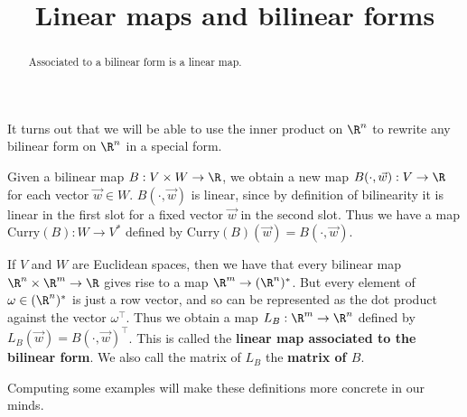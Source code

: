 \documentclass{ximera}
\title{Linear maps and bilinear forms}
\begin{document}
\begin{abstract}
  Associated to a bilinear form is a linear map.
\end{abstract}\maketitle
	
It turns out that we will be able to use the inner product on $\R^n$ to rewrite any bilinear form on $\R^n$ in a special form. 
	
Given a bilinear map $B:V \times W \to \R$, we obtain a new map $B(\cdot, \vec{w}):V \to \R$ for each vector $\vec{w} \in W$.   $B(\cdot, \vec{w})$ is linear, since 
by definition of bilinearity it is linear in the first slot for a fixed vector $\vec{w}$ in the second slot.  Thus we have a map $\textrm{Curry}(B): W \to V^*$ defined by $\textrm{Curry}(B)(\vec{w}) = B(\cdot, \vec{w})$.
	
If $V$ and $W$ are Euclidean spaces, then we have that every bilinear map $\R^n \times \R^m \to \R$ gives rise to a map $\R^m \to (\R^n)^*$.  But every element
of $ \omega \in (\R^n)^*$ is just a row vector, and so can be represented as the dot product against the vector  $\omega^\top$.  
Thus we obtain a map $L_B:\R^m \to \R^n$ defined by $L_B(\vec{w}) = B(\cdot,\vec{w})^\top$. 
This is called the \textbf{linear map associated to the bilinear form}. 
We also call the matrix of $L_B$ the \textbf{matrix of $B$}.
	
Computing some examples will make these definitions more concrete in our minds.
	
\end{document}
